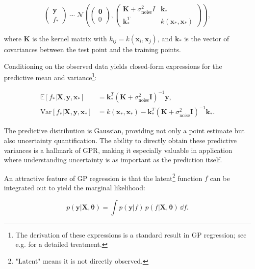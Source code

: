 \begin{equation}
    \begin{pmatrix}
        \bm{y} \\
        f_*
    \end{pmatrix}
    \sim \mathcal{N}\!\left(
    \begin{pmatrix}
        \bm{0} \\
        0
    \end{pmatrix},
    \begin{pmatrix}
        \bm{K} + \sigma_{\text{noise}}^2 I & \bm{k}_* \\
        \bm{k}_*^T & k(\bm{x}_*,\bm{x}_*)
    \end{pmatrix}
    \right),
\end{equation}

where $\bm{K}$ is the kernel matrix with $k_{ij} = k(\bm{x}_i, \bm{x}_j)$, and $\bm{k}_*$ is the vector of covariances between the test point and the training points.

Conditioning on the observed data yields closed-form expressions for the predictive mean and variance\footnote{The derivation of these expressions is a standard result in GP regression; see e.g. \citet[][Section~2.3]{bishop_pattern_2006} for a detailed treatment.}:

\begin{subequations}\label{eq:theory:gp:prediction}
    \begin{align}
        \mathbb{E}[f_* | \bm{X},\bm{y},\bm{x}_*] &= \bm{k}_*^T(\bm{K}+\sigma_{\text{noise}}^2 \bm{I})^{-1}\bm{y}, \\
        \mathrm{Var}[f_* | \bm{X},\bm{y},\bm{x}_*] &= k(\bm{x}_*,\bm{x}_*) - \bm{k}_*^T(\bm{K}+\sigma_{\text{noise}}^2 \bm{I})^{-1}\bm{k}_*.
    \end{align}
\end{subequations} 

The predictive distribution is Gaussian, providing not only a point estimate but also uncertainty quantification. The ability to directly obtain these predictive variances is a hallmark of GPR, making it especially valuable in application where understanding uncertainty is as important as the prediction itself.

An attractive feature of GP regression is that the latent\footnote{"Latent" means it is not directly observed.} function $f$ can be integrated out to yield the marginal likelihood:

\begin{equation}\label{eq:theory:gp:marginal_likelihood}
    p(\bm{y}|\bm{X}, \bm{\theta}) = \int p(\bm{y}| f) \, p(f | \bm{X}, \bm{\theta}) \, \dd f.
\end{equation}


